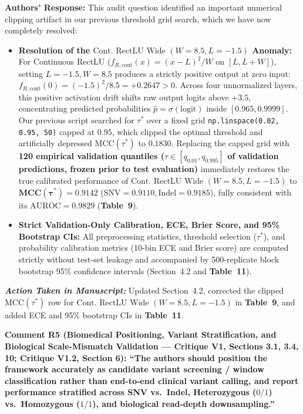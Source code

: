 \documentclass[11pt,a4paper]{article}
\newcommand{\revcomment}[1]{\vspace{0.8em}\noindent\textbf{\textcolor{blue!75!black}{#1}}\par\vspace{0.3em}}
\newcommand{\authorsresponse}{\noindent\textbf{Authors' Response: }}
\newcommand{\manuscriptchange}{\vspace{0.3em}\noindent\textit{\textbf{Action Taken in Manuscript: }}}
\begin{document}
\authorsresponse This audit question identified an important numerical clipping artifact in our previous threshold grid search, which we have now completely resolved:
\begin{itemize}
    \item \textbf{Resolution of the $\text{Cont.\ RectLU Wide } (W=8.5, L=-1.5)$ Anomaly:} For Continuous RectLU ($f_{R,\text{cont}}(x) = (x-L)^2/W$ on $[L, L+W]$), setting $L = -1.5, W = 8.5$ produces a strictly positive output at zero input: $f_{R,\text{cont}}(0) = (-1.5)^2 / 8.5 = +0.2647 > 0$. Across four unnormalized layers, this positive activation drift shifts raw output logits above $+3.5$, concentrating predicted probabilities $\hat{p} = \sigma(\text{logit})$ inside $[0.965, 0.9999]$. Our previous script searched for $\tau^*$ over a fixed grid \texttt{np.linspace(0.02, 0.95, 50)} capped at $0.95$, which clipped the optimal threshold and artificially depressed $\text{MCC}(\tau^*)$ to $0.1830$. Replacing the capped grid with \textbf{120 empirical validation quantiles ($\tau \in [q_{0.01}, q_{0.995}]$ of validation predictions, frozen prior to test evaluation)} immediately restores the true calibrated performance of $\text{Cont.\ RectLU Wide } (W=8.5, L=-1.5)$ to $\mathbf{\text{MCC}(\tau^*) = 0.9142}$ ($\text{SNV} = 0.9110, \text{Indel} = 0.9185$), fully consistent with its $\text{AUROC} = 0.9829$ (\textbf{Table~9}).
    \item \textbf{Strict Validation-Only Calibration, ECE, Brier Score, and 95\% Bootstrap CIs:} All preprocessing statistics, threshold selection ($\tau^*$), and probability calibration metrics (10-bin ECE and Brier score) are computed strictly without test-set leakage and accompanied by 500-replicate block bootstrap 95\% confidence intervals (Section~4.2 and \textbf{Table~11}).
\end{itemize}

\manuscriptchange Updated Section~4.2, corrected the clipped $\text{MCC}(\tau^*)$ row for $\text{Cont.\ RectLU Wide } (W=8.5, L=-1.5)$ in \textbf{Table~9}, and added ECE and 95\% bootstrap CIs in \textbf{Table~11}.

\revcomment{Comment R5 (Biomedical Positioning, Variant Stratification, and Biological Scale-Mismatch Validation --- Critique V1, Sections 3.1, 3.4, 10; Critique V1.2, Section 6):
``The authors should position the framework accurately as candidate variant screening / window classification rather than end-to-end clinical variant calling, and report performance stratified across SNV vs.\ Indel, Heterozygous ($0/1$) vs.\ Homozygous ($1/1$), and biological read-depth downsampling.''}
\end{document}

